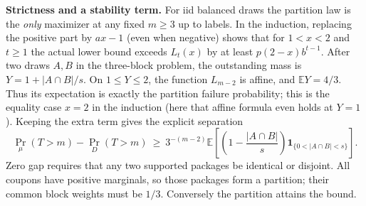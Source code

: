 \documentclass[11pt]{article}
\begin{document}
\textbf{Strictness and a stability term.} For iid balanced draws the
partition law is the \emph{only} maximizer at any fixed \(m\ge3\) up to
labels. In the induction, replacing the positive part by \(ax-1\) (even
when negative) shows that for \(1<x<2\) and \(t\ge1\) the actual lower
bound exceeds \(L_t(x)\) by at least \(p(2-x)b^{t-1}\). After two draws
\(A,B\) in the three-block problem, the outstanding mass is
\(Y=1+|A\cap B|/s\). On \(1\le Y\le2\), the function \(L_{m-2}\) is
affine, and \(\mathbb E Y=4/3\). Thus its expectation is exactly the
partition failure probability; this is the equality case \(x=2\) in the
induction (here that affine formula even holds at \(Y=1\)). Keeping the
extra term gives the explicit separation \[
 \Pr_\mu(T>m)-\Pr_D(T>m)\ \ge\
 3^{-(m-2)}\mathbb E\!\left[
     \left(1-\frac{|A\cap B|}{s}\right)
       \mathbf1_{\{0<|A\cap B|<s\}}\right].
\] Zero gap requires that any two supported packages be identical or
disjoint. All coupons have positive marginals, so those packages form a
partition; their common block weights must be \(1/3\). Conversely the
partition attains the bound.
\end{document}
